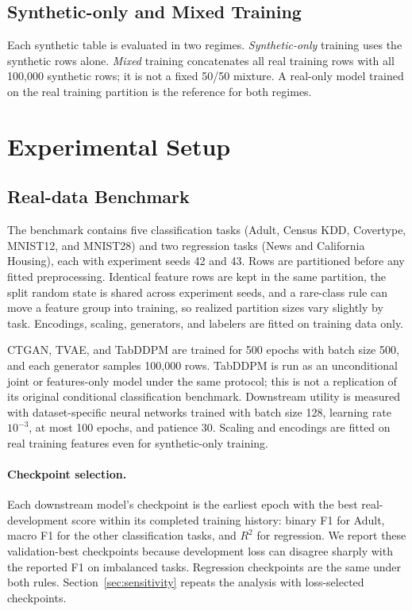 \documentclass[letterpaper]{article}
\begin{document}
\subsection{Synthetic-only and Mixed Training}
Each synthetic table is evaluated in two regimes. \emph{Synthetic-only}
training uses the synthetic rows alone. \emph{Mixed} training concatenates
all real training rows with all 100,000 synthetic rows; it is not a fixed
50/50 mixture. A real-only model trained on the real training partition is
the reference for both regimes.

\section{Experimental Setup}
\subsection{Real-data Benchmark}
The benchmark contains five classification tasks (Adult, Census KDD,
Covertype, MNIST12, and MNIST28) and two regression tasks (News and
California Housing), each with experiment seeds 42 and 43. Rows are
partitioned before any fitted preprocessing. Identical feature rows are kept
in the same partition, the split random state is shared across experiment
seeds, and a rare-class rule can move a feature group into training, so
realized partition sizes vary slightly by task. Encodings, scaling,
generators, and labelers are fitted on training data only.

CTGAN, TVAE, and TabDDPM are trained for 500 epochs with batch size 500, and
each generator samples 100,000 rows. TabDDPM is run as an unconditional
joint or features-only model under the same protocol; this is not a
replication of its original conditional classification benchmark.
Downstream utility is measured with dataset-specific neural networks
trained with batch size 128, learning rate $10^{-3}$, at most 100 epochs,
and patience 30. Scaling and encodings are fitted on real training
features even for synthetic-only training.

\paragraph{Checkpoint selection.} Each downstream model's checkpoint is the
earliest epoch with the best real-development score within its completed
training history: binary F1 for Adult, macro F1 for the other
classification tasks, and $R^2$ for regression. We report these
validation-best checkpoints because development loss can disagree sharply
with the reported F1 on imbalanced tasks. Regression checkpoints are the
same under both rules. Section~\ref{sec:sensitivity} repeats the analysis
with loss-selected checkpoints.
\end{document}

